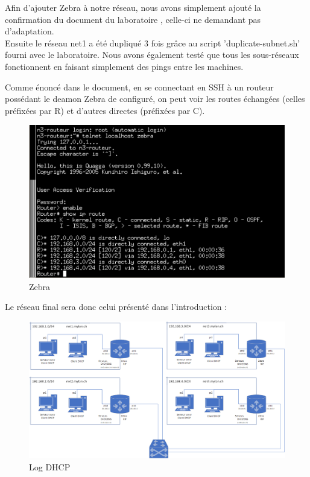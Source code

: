 \documentclass{article}
\begin{document}
Afin d'ajouter Zebra à notre réseau, nous avons simplement ajouté la confirmation du document du laboratoire \cite{doc-labo}, celle-ci ne demandant pas d'adaptation.\\

Ensuite le réseau net1 a été dupliqué 3 fois grâce au script 'duplicate-subnet.sh' fourni avec le laboratoire. Nous avons également testé que tous les sous-réseaux fonctionnent en faisant simplement des pings entre les machines.

Comme énoncé dans le document, en se connectant en SSH à un routeur possédant le deamon Zebra de configuré, on peut voir les routes échangées (celles préfixées par R) et d'autres directes (préfixées par C).

\begin{figure}[!h]
	\centering
	\includegraphics{./captures/zebra-check.png}
	\caption{Zebra}
	\label{fig:Zebra}
\end{figure}

Le réseau final sera donc celui présenté dans l'introduction : 

\begin{figure}[!h]
	\centering
	\includegraphics[width=\textwidth]{./schemas/Schema-complet.png}
	\caption{Log DHCP}
	\label{fig:Log DHCP}
\end{figure}
\end{document}

